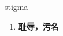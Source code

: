 
\begin{frame}
{\huge stigma}
\begin{center}
\begin{enumerate}\Large
  \item \textbf{耻辱，污名}
\end{enumerate}
\end{center}
\end{frame}
